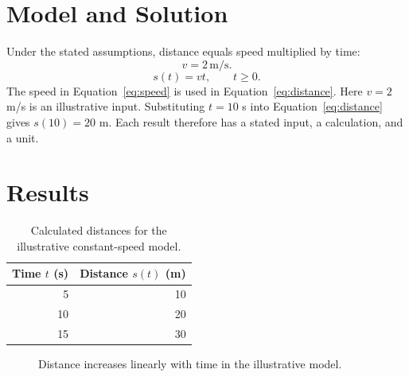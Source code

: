 \documentclass[11pt,letterpaper]{article}
\begin{document}
\newpage
\section{Model and Solution}
Under the stated assumptions, distance equals speed multiplied by time:
\begin{equation}
  v = 2\,\mathrm{m/s}.
  \label{eq:speed}
\end{equation}
\begin{equation}
  s(t)=vt, \qquad t\geq 0.
  \label{eq:distance}
\end{equation}
The speed in Equation~\eqref{eq:speed}
is used in Equation~\eqref{eq:distance}.
Here $v=2$ m/s is an illustrative input. Substituting $t=10$ s into
Equation~\eqref{eq:distance} gives $s(10)=20$ m. Each result therefore
has a stated input, a calculation, and a unit.

\section{Results}
\begin{table}[htbp]
  \centering
  \caption{Calculated distances for the illustrative constant-speed model.}
  \label{tab:distance}
  \begin{tabular}{rr}
    \toprule
    Time $t$ (s) & Distance $s(t)$ (m) \\
    \midrule
    5 & 10 \\
    10 & 20 \\
    15 & 30 \\
    \bottomrule
  \end{tabular}
\end{table}


\begin{figure}[htbp]
  \centering
  \caption{Distance increases linearly with time in the illustrative model.}
  \label{fig:distance}
\end{figure}
\end{document}
